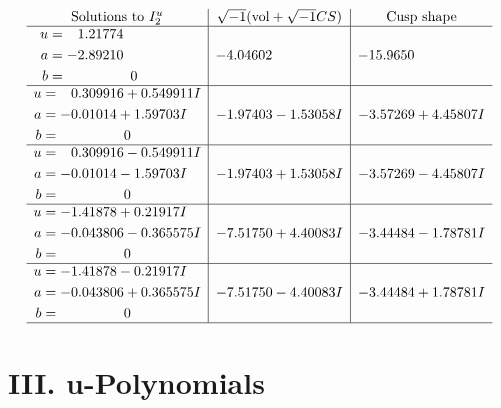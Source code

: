\documentclass[1p]{elsarticle_modified}
\theoremstyle{definition}
\newcommand{\I}{\sqrt{-1}}
\begin{document}
$$\begin{array}{c|c|c}  
\text{Solutions to }I^u_{2}& \I (\text{vol} + \sqrt{-1}CS) & \text{Cusp shape}\\
 \hline 
\begin{aligned}
u &= \phantom{-}1.21774\phantom{ +0.000000I} \\
a &= -2.89210\phantom{ +0.000000I} \\
b &= \phantom{-0.000000 } 0\end{aligned}
 & -4.04602\phantom{ +0.000000I} & -15.9650\phantom{ +0.000000I} \\ \hline\begin{aligned}
u &= \phantom{-}0.309916 + 0.549911 I \\
a &= -0.01014 + 1.59703 I \\
b &= \phantom{-0.000000 } 0\end{aligned}
 & -1.97403 - 1.53058 I & -3.57269 + 4.45807 I \\ \hline\begin{aligned}
u &= \phantom{-}0.309916 - 0.549911 I \\
a &= -0.01014 - 1.59703 I \\
b &= \phantom{-0.000000 } 0\end{aligned}
 & -1.97403 + 1.53058 I & -3.57269 - 4.45807 I \\ \hline\begin{aligned}
u &= -1.41878 + 0.21917 I \\
a &= -0.043806 - 0.365575 I \\
b &= \phantom{-0.000000 } 0\end{aligned}
 & -7.51750 + 4.40083 I & -3.44484 - 1.78781 I \\ \hline\begin{aligned}
u &= -1.41878 - 0.21917 I \\
a &= -0.043806 + 0.365575 I \\
b &= \phantom{-0.000000 } 0\end{aligned}
 & -7.51750 - 4.40083 I & -3.44484 + 1.78781 I\\
 \hline 
 \end{array}$$\newpage
\newpage\renewcommand{\arraystretch}{1}
\centering \section*{ III. u-Polynomials}
\end{document}
